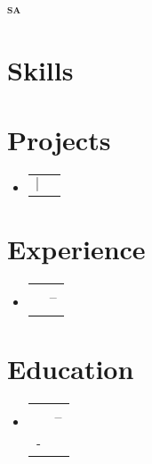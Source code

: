 \documentclass[letterpaper,11pt]{article}
\makeatletter
\newcommand{\resumeSubheading}[4]{
  \vspace{-2pt}\item
    \begin{tabular*}{0.97\textwidth}{l@{\extracolsep{\fill}}r}
      \textbf{#1} & #2 \\
      \textit{#3} & \textit{#4} \\
    \end{tabular*}\vspace{-7pt}
}
\newcommand{\resumeProjectHeading}[2]{
  \item
    \begin{tabular*}{0.97\textwidth}{l@{\extracolsep{\fill}}r}
      {#1} & #2 \\
    \end{tabular*}\vspace{-7pt}
}
\newcommand{\resumeSubHeadingListStart}{\begin{itemize}[leftmargin=0.15in, label={}]}
\newcommand{\resumeSubHeadingListEnd}{\end{itemize}}
\makeatother
\begin{document}
\begin{center}
  \textbf{\Huge \scshape sa} \\ \vspace{3pt}
  
  
  
  
\end{center}

\section{Skills}
\begin{itemize}[leftmargin=0.15in, label={}]
  
  
  
  
  
\end{itemize}

\section{Projects}
\resumeSubHeadingListStart

  \resumeProjectHeading
    {\textbf{}  $|$ \emph{}}{}
    

\resumeSubHeadingListEnd

\section{Experience}
\resumeSubHeadingListStart

  \resumeSubheading
    {}{--}
    {}{}
    

\resumeSubHeadingListEnd

\section{Education}
\resumeSubHeadingListStart

  \resumeSubheading
    {}{--}
    {-}{}

\resumeSubHeadingListEnd
\end{document}
